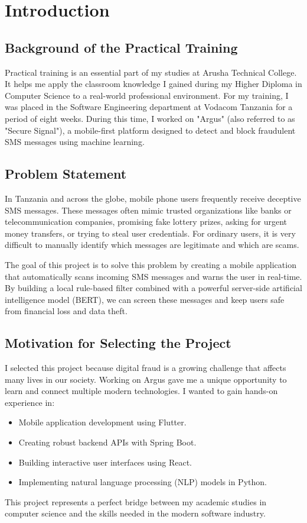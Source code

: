 \chapter{Introduction}
\label{ch:introduction}

\section{Background of the Practical Training}
Practical training is an essential part of my studies at Arusha Technical College. It helps me apply the classroom knowledge I gained during my Higher Diploma in Computer Science to a real-world professional environment. For my training, I was placed in the Software Engineering department at Vodacom Tanzania for a period of eight weeks. During this time, I worked on "Argus" (also referred to as "Secure Signal"), a mobile-first platform designed to detect and block fraudulent SMS messages using machine learning.

\section{Problem Statement}
In Tanzania and across the globe, mobile phone users frequently receive deceptive SMS messages. These messages often mimic trusted organizations like banks or telecommunication companies, promising fake lottery prizes, asking for urgent money transfers, or trying to steal user credentials. For ordinary users, it is very difficult to manually identify which messages are legitimate and which are scams. 

The goal of this project is to solve this problem by creating a mobile application that automatically scans incoming SMS messages and warns the user in real-time. By building a local rule-based filter combined with a powerful server-side artificial intelligence model (BERT), we can screen these messages and keep users safe from financial loss and data theft.

\section{Motivation for Selecting the Project}
I selected this project because digital fraud is a growing challenge that affects many lives in our society. Working on Argus gave me a unique opportunity to learn and connect multiple modern technologies. I wanted to gain hands-on experience in:
\begin{itemize}
  \item Mobile application development using Flutter.
  \item Creating robust backend APIs with Spring Boot.
  \item Building interactive user interfaces using React.
  \item Implementing natural language processing (NLP) models in Python.
\end{itemize}
This project represents a perfect bridge between my academic studies in computer science and the skills needed in the modern software industry.

